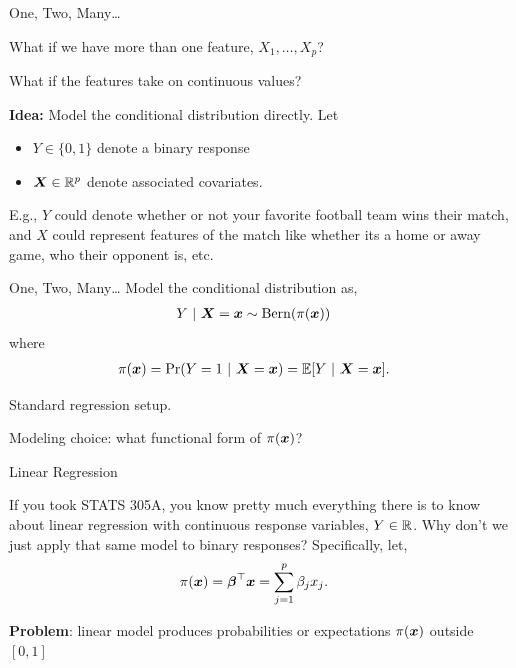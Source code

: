 \documentclass[aspectratio=169]{beamer}
\begin{document}
\begin{frame}[t,allowframebreaks]{One, Two, Many\ldots{}}\label{one-two-many}

What if we have more than one feature, \(X_1, \ldots, X_p\)? 

What if the features take on continuous values? 

\textbf{Idea:} Model the conditional distribution directly. Let
\begin{itemize}
    \item \(Y \in \{0,1\}\) denote a binary response 
    \item \(\boldsymbol{X} \in \mathbb{R}^p\) denote associated covariates.
\end{itemize} 

E.g., \(Y\) could denote whether or
not your favorite football team wins their match, and \(X\) could
represent features of the match like whether its a home or away game,
who their opponent is, etc. 
\end{frame}

\begin{frame}[t,allowframebreaks]{One, Two, Many\ldots{}}\label{one-two-many2}
Model the conditional distribution as, 
\begin{align*}
Y ~\vert~ \boldsymbol{X} = \boldsymbol{x} &\sim \mathrm{Bern}(\pi(\boldsymbol{x}))
\end{align*} 
where 
\begin{align*}
\pi(\boldsymbol{x}) &= \Pr(Y = 1 ~\vert~ \boldsymbol{X}=\boldsymbol{x}) = \mathbb{E}[Y ~\vert~ \boldsymbol{X}=\boldsymbol{x}].
\end{align*}

Standard regression setup. 

Modeling choice: what functional form of \(\pi(\boldsymbol{x})\)?

\end{frame}

\begin{frame}[t,allowframebreaks]{Linear Regression}\label{linear-regression}

If you took STATS 305A, you know pretty much everything there is to know
about linear regression with continuous response variables,
\(Y \in \mathbb{R}\). Why don't we just apply that same model to binary
responses? Specifically, let, \begin{align*}
\pi(\boldsymbol{x}) &= \boldsymbol{\beta}^\top \boldsymbol{x} = \sum_{j=1}^p \beta_j x_j. 
\end{align*}

\textbf{Problem}: linear model produces probabilities or
expectations \(\pi(\boldsymbol{x}) \) outside $[0,1]$
\end{frame}
\end{document}

